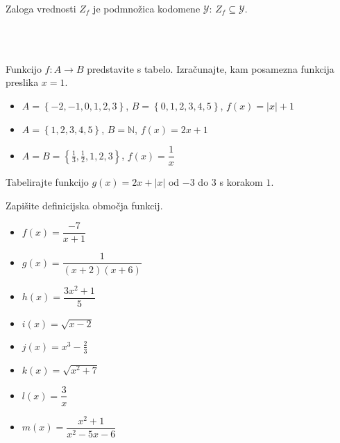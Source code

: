         Zaloga vrednosti $Z_f$ je podmnožica kodomene $\mathcal{Y}$: $Z_f\subseteq \mathcal{Y}$.


~\\~\\



    \begin{naloga}
        Funkcijo $f: A\to B$ predstavite s tabelo. Izračunajte, kam posamezna funkcija preslika $x=1$.
        \begin{itemize}
            \item $A=\left\{-2, -1, 0, 1, 2, 3\right\}$, $B=\left\{0, 1, 2, 3, 4, 5\right\}$, $f(x)=|x|+1$ 
            \item $A=\left\{1, 2, 3, 4, 5\right\}$, $B=\mathbb{N}$, $f(x)=2x+1$ 
            \item $A=B=\left\{\frac{1}{3}, \frac{1}{2}, 1, 2, 3\right\}$, $f(x)=\dfrac{1}{x}$ 
        \end{itemize} 
    \end{naloga}
   
    \begin{naloga}
        Tabelirajte funkcijo $g(x)=2x+|x|$ od $-3$ do $3$ s korakom $1$. 
    \end{naloga}


    \begin{naloga}
        Zapišite definicijska območja funkcij.
        \begin{multicols}{2}
            \begin{itemize}
                \item $f(x)=\dfrac{-7}{x+1}$ 
                \item $g(x)=\dfrac{1}{(x+2)(x+6)}$ 
                \item $h(x)=\dfrac{3x^2+1}{5}$ 
                \item $i(x)=\sqrt{x-2}$ 
                \item $j(x)=x^3-\frac{2}{3}$ 
                \item $k(x)=\sqrt{x^2+7}$ 
                \item $l(x)=\dfrac{3}{x}$ 
                \item $m(x)=\dfrac{x^2+1}{x^2-5x-6}$ 
            \end{itemize}
        \end{multicols}
    \end{naloga}



